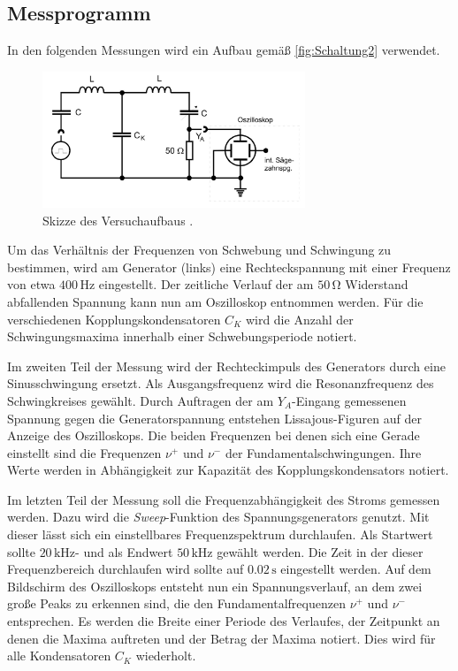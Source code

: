 \subsection{Messprogramm}
\label{subsec:Messprogramm}
In den folgenden Messungen wird ein Aufbau gemäß \autoref{fig:Schaltung2} verwendet. 
\begin{figure}
    \centering
	\caption{Skizze des Versuchaufbaus \cite{v355}.}
    \label{fig:Schaltung2}
    \includegraphics[width=0.7\textwidth]{content/Schaltung2.jpg}
\end{figure}
Um das Verhältnis der Frequenzen von Schwebung und Schwingung zu bestimmen, wird am Generator (links) eine Rechteckspannung mit einer Frequenz von etwa $400\, \unit{\hertz}$
eingestellt. Der zeitliche Verlauf der am $50 \, \unit{\ohm}$ Widerstand abfallenden Spannung kann nun am Oszilloskop entnommen werden. Für die verschiedenen 
Kopplungskondensatoren $C_K$ wird die Anzahl der Schwingungsmaxima innerhalb einer Schwebungsperiode notiert.

Im zweiten Teil der Messung wird der Rechteckimpuls des Generators durch eine Sinusschwingung ersetzt. Als Ausgangsfrequenz wird die Resonanzfrequenz des Schwingkreises
gewählt. Durch Auftragen der am $Y_A$-Eingang gemessenen Spannung gegen die Generatorspannung entstehen Lissajous-Figuren auf der Anzeige des Oszilloskops. Die beiden 
Frequenzen bei denen sich eine Gerade einstellt sind die Frequenzen $\nu^+$ und $\nu^-$ der Fundamentalschwingungen. Ihre Werte werden in Abhängigkeit zur Kapazität 
des Kopplungskondensators notiert.

Im letzten Teil der Messung soll die Frequenzabhängigkeit des Stroms gemessen werden. Dazu wird die \textit{Sweep}-Funktion des Spannungsgenerators genutzt. Mit dieser
lässt sich ein einstellbares Frequenzspektrum durchlaufen. Als Startwert sollte $20 \, \unit{\kilo\hertz}$- und als Endwert $50 \, \unit{\kilo\hertz}$ gewählt werden. Die Zeit 
in der dieser Frequenzbereich durchlaufen wird sollte auf $0.02 \, \unit{\second}$ eingestellt werden. Auf dem Bildschirm des Oszilloskops entsteht nun ein Spannungsverlauf,
an dem zwei große Peaks zu erkennen sind, die den Fundamentalfrequenzen $\nu^+$ und $\nu^-$ entsprechen. Es werden die Breite einer Periode des Verlaufes, der Zeitpunkt an
denen die Maxima auftreten und der Betrag der Maxima notiert. Dies wird für alle Kondensatoren $C_K$ wiederholt.
